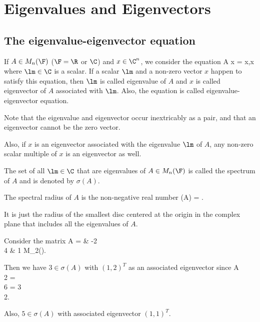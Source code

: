 \section{Eigenvalues and Eigenvectors}

\subsection{The eigenvalue-eigenvector equation}

\begin{definition}\label{def:eigenvalue_eigenvector}
If $A\in M_n(\F)$ ($\F = \R$ or $\C$) and $x\in \C^n$, we consider the equation
\be
A x = \lm x,\qquad x
\ee
where $\lm\in \C$ is a scalar. If a scalar $\lm$ and a non-zero vector $x$ happen to satisfy this equation, then $\lm$ is called eigenvalue of $A$ and $x$ is called eigenvector of $A$ associated with $\lm$.
Also, the equation is called eigenvalue-eigenvector equation.
\end{definition}

\begin{remark}
Note that the eigenvalue and eigenvector occur inextricably as a pair, and that an eigenvector cannot be the zero vector.

Also, if $x$ is an eigenvector associated with the eigenvalue $\lm$ of $A$, any non-zero scalar multiple of $x$ is an eigenvector as well.
\end{remark}



\begin{definition}
The set of all $\lm\in \C$ that are eigenvalues of $A\in M_n(\F)$ is called the spectrum of $A$ and is denoted by $\sigma(A)$.

The spectral radius of $A$ is the non-negative real number
\be
\rho(A) = \max{}.
\ee

It is just the radius of the smallest disc centered at the origin in the complex plane that includes all the eigenvalues of $A$.
\end{definition}

\begin{example}
Consider the matrix
\be
A =  & -2 \\ 4 & 1 \eepm \in M_2(\R).
\ee

Then we have $3\in \sigma(A)$ with $(1,2)^T$ as an associated eigenvector since
\be
A  \\ 2 \eepm = \\ 6 \eepm = 3\\ 2\eepm.
\ee

Also, $5\in \sigma(A)$ with associated eigenvector $(1,1)^T$.
\end{example}


